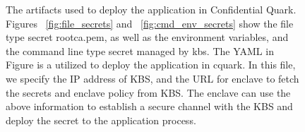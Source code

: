\begin{figure}[H]
\begin{minipage}{0.7\textwidth}
\begin{subcolumns}[0.62\textwidth]
    \nextsubfigure
    \end{subcolumns}
    \end{minipage}
    
    \caption[The artifacts used to deploy the application in Confidential Quark]{The artifacts used to deploy the application in Confidential Quark. Figures ~\ref{fig:file_secrets} and ~\ref{fig:cmd_env_secrets} show the file type secret root\-ca.pem, as well as the environment variables, and the command line type secret managed by kbs. The YAML in Figure  is
    a utilized to deploy the application in cquark. In this file, we specify the IP address of KBS, and the URL for enclave to fetch the secrets and enclave policy from KBS. The enclave can use the above information to establish a secure channel with the KBS and 
    deploy the secret to the application process.}
    \label{fig:cquark_deployment}
\end{figure}



